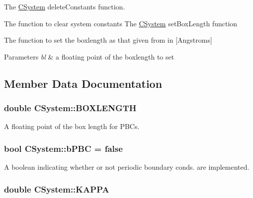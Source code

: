 The \hyperlink{classCSystem}{C\-System} delete\-Constants function. 

The function to clear system constants The \hyperlink{classCSystem}{C\-System} set\-Box\-Length function

The function to set the boxlength as that given from in \mbox{[}Angstroms\mbox{]} 
\begin{DoxyParams}{Parameters}
{\em bl} & a floating point of the boxlength to set \\
\hline
\end{DoxyParams}


\subsection{Member Data Documentation}
\hypertarget{classCSystem_a59f4db8047443eac01a56ff40c7d1592}{
\subsubsection[{B\-O\-X\-L\-E\-N\-G\-T\-H}]{\setlength{\rightskip}{0pt plus 5cm}double C\-System\-::\-B\-O\-X\-L\-E\-N\-G\-T\-H\hspace{0.3cm}{\ttfamily [static]}}}\label{classCSystem_a59f4db8047443eac01a56ff40c7d1592}


A floating point of the box length for P\-B\-Cs. 

\hypertarget{classCSystem_ad4220c7ae13d01939b760aa998afe9f0}{
\subsubsection[{b\-P\-B\-C}]{\setlength{\rightskip}{0pt plus 5cm}bool C\-System\-::b\-P\-B\-C = false\hspace{0.3cm}{\ttfamily [static]}}}\label{classCSystem_ad4220c7ae13d01939b760aa998afe9f0}


A boolean indicating whether or not periodic boundary conds. are implemented. 

\hypertarget{classCSystem_a26c3b08c72081eee05d8dd12010860de}{
\subsubsection[{K\-A\-P\-P\-A}]{\setlength{\rightskip}{0pt plus 5cm}double C\-System\-::\-K\-A\-P\-P\-A\hspace{0.3cm}{\ttfamily [static]}}}\label{classCSystem_a26c3b08c72081eee05d8dd12010860de}


